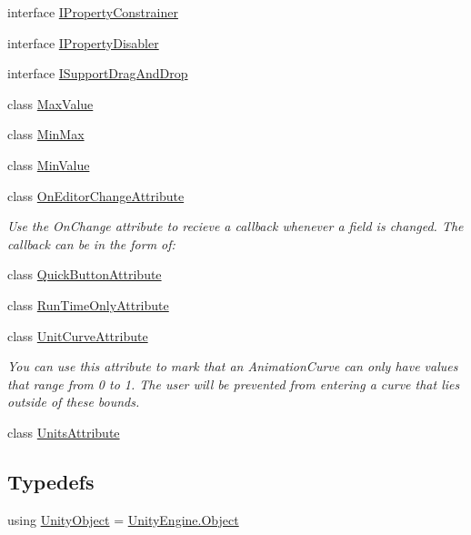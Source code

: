 \begin{DoxyCompactItemize}
interface \mbox{\hyperlink{interface_leap_1_1_unity_1_1_attributes_1_1_i_property_constrainer}{I\+Property\+Constrainer}}
\item 
interface \mbox{\hyperlink{interface_leap_1_1_unity_1_1_attributes_1_1_i_property_disabler}{I\+Property\+Disabler}}
\item 
interface \mbox{\hyperlink{interface_leap_1_1_unity_1_1_attributes_1_1_i_support_drag_and_drop}{I\+Support\+Drag\+And\+Drop}}
\item 
class \mbox{\hyperlink{class_leap_1_1_unity_1_1_attributes_1_1_max_value}{Max\+Value}}
\item 
class \mbox{\hyperlink{class_leap_1_1_unity_1_1_attributes_1_1_min_max}{Min\+Max}}
\item 
class \mbox{\hyperlink{class_leap_1_1_unity_1_1_attributes_1_1_min_value}{Min\+Value}}
\item 
class \mbox{\hyperlink{class_leap_1_1_unity_1_1_attributes_1_1_on_editor_change_attribute}{On\+Editor\+Change\+Attribute}}
\begin{DoxyCompactList}\small\item\em Use the On\+Change attribute to recieve a callback whenever a field is changed. The callback can be in the form of\+: \end{DoxyCompactList}\item 
class \mbox{\hyperlink{class_leap_1_1_unity_1_1_attributes_1_1_quick_button_attribute}{Quick\+Button\+Attribute}}
\item 
class \mbox{\hyperlink{class_leap_1_1_unity_1_1_attributes_1_1_run_time_only_attribute}{Run\+Time\+Only\+Attribute}}
\item 
class \mbox{\hyperlink{class_leap_1_1_unity_1_1_attributes_1_1_unit_curve_attribute}{Unit\+Curve\+Attribute}}
\begin{DoxyCompactList}\small\item\em You can use this attribute to mark that an Animation\+Curve can only have values that range from 0 to 1. The user will be prevented from entering a curve that lies outside of these bounds. \end{DoxyCompactList}\item 
class \mbox{\hyperlink{class_leap_1_1_unity_1_1_attributes_1_1_units_attribute}{Units\+Attribute}}
\end{DoxyCompactItemize}
\subsection*{Typedefs}
\begin{DoxyCompactItemize}
\item 
using \mbox{\hyperlink{namespace_leap_1_1_unity_1_1_attributes_a71d15e38cb19d7d2ffb1aa310ce8f0f9}{Unity\+Object}} = \mbox{\hyperlink{namespace_leap_1_1_unity_1_1_attributes_a4b8f0ac9a7b74b480178dc5fb4069a89a497031794414a552435f90151ac3b54b}{Unity\+Engine.\+Object}}
\end{DoxyCompactItemize}
